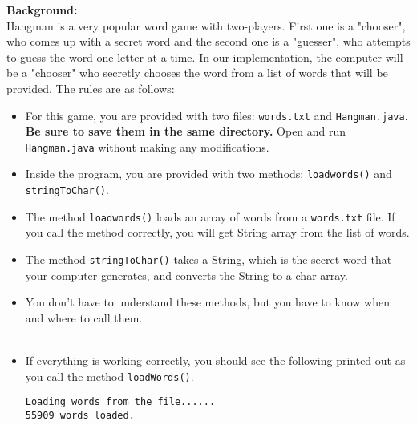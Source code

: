 \documentclass[12pt]{article}
\begin{document}
\noindent\textbf{Background:}\\
Hangman is a very popular word game with two-players. First one is a "chooser", who comes up with a secret word and the second one is a "guesser", who attempts to guess the word one letter at a time. In our implementation, the computer will be a "chooser" who secretly chooses the word from a list of words that will be provided. The rules are as follows:
\begin{itemize}
	\item For this game, you are provided with two files: \texttt{words.txt} and \texttt{Hangman.java}. \textbf{Be sure to save them in the same directory.} Open and run \texttt{Hangman.java} without making any modifications.
	\item Inside the program, you are provided with two methods:  \texttt{loadwords()} and \texttt{stringToChar()}.
	\item The method \texttt{loadwords()} loads an array of words from a \texttt{words.txt} file. If you call the method correctly, you will get String array from the list of words.
	\item The method \texttt{stringToChar()} takes a String, which is the secret word that your computer generates, and converts the String to a char array. 
	\item You don't have to understand these methods, but you have to know when and where to call them.
	\\
	\\
	\item If everything is working correctly, you should see the following printed out as you call the method \texttt{loadWords()}.
\begin{center}
	\begin{minipage}{9cm}
		\texttt{Loading words from the file......}\\
		\texttt{55909 words loaded.}\\
		\texttt{\textendash \textendash \textendash \textendash \textendash \textendash \textendash \textendash \textendash \textendash \textendash \textendash \textendash}\\
	\end{minipage}
\end{center}

	
\end{itemize}
\end{document}
